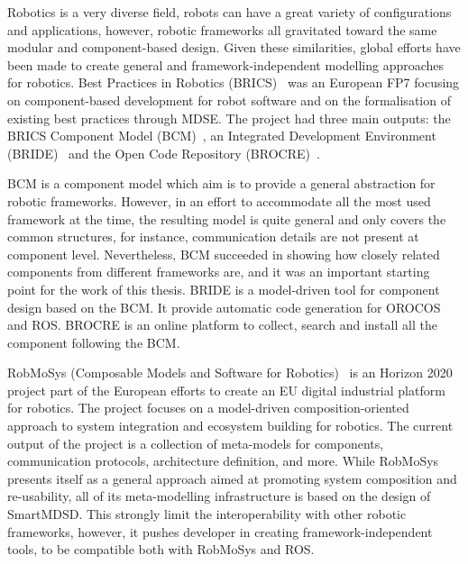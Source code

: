 Robotics is a very diverse field, robots can have a great variety of configurations and applications, however, robotic frameworks all gravitated toward the same modular and component-based design. Given these similarities, global efforts have been made to create general and framework-independent modelling approaches for robotics. Best Practices in Robotics (BRICS)~\cite{bischoff2010brics} was an European FP7 focusing on component-based development for robot software and on the formalisation of existing best practices through MDSE. The project had three main outputs: the BRICS Component Model (BCM)~\cite{bruyninckx2013brics}, an Integrated Development Environment (BRIDE)~\cite{bubeck2014bride} and the Open Code Repository (BROCRE)~\cite{kraetzschmar2010specifications}.

BCM is a component model which aim is to provide a general abstraction for robotic frameworks. However, in an effort to accommodate all the most used framework at the time, the resulting model is quite general and only covers the common structures, for instance, communication details are not present at component level. Nevertheless, BCM succeeded in showing how closely related components from different frameworks are, and it was an important starting point for the work of this thesis. BRIDE is a model-driven tool for component design based on the BCM. It provide automatic code generation for OROCOS and ROS. BROCRE is an online platform to collect, search and install all the component following the BCM.

RobMoSys (Composable Models and Software for Robotics)~\cite{robmosys} is an Horizon 2020 project part of the European efforts to create an EU digital industrial platform for robotics. The project focuses on a model-driven composition-oriented approach to system integration and ecosystem building for robotics. The current output of the project is a collection of meta-models for components, communication protocols, architecture definition, and more. While RobMoSys presents itself as a general approach aimed at promoting system composition and re-usability, all of its meta-modelling infrastructure is based on the design of SmartMDSD. This strongly limit the interoperability with other robotic frameworks, however, it pushes developer in creating framework-independent tools, to be compatible both with RobMoSys and ROS.

